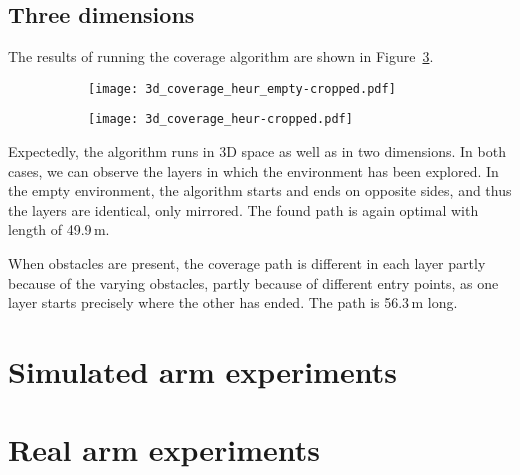 \documentclass[buriama8_dp.tex]{subfiles}
\begin{document}
\subsection{Three dimensions}
\label{subsec:3d_sim}

The results of running the coverage algorithm are shown in Figure~\ref{fig:heur_3d_coverage}.

\begin{figure}[ht]
  \centering
  \begin{subfigure}[t]{0.48\textwidth}
    \texttt{[image: 3d\_coverage\_heur\_empty-cropped.pdf]}
    \caption{}
    \label{fig:heur_3d_empty}
  \end{subfigure}
  \;
  \begin{subfigure}[t]{0.48\textwidth}
    \texttt{[image: 3d\_coverage\_heur-cropped.pdf]}
    \caption{}
    \label{fig:heur_3d_env}
  \end{subfigure}
  
  \caption[Coverage path -- compact space heuristic in 3D]{}
  \label{fig:heur_3d_coverage}
\end{figure}

Expectedly, the algorithm runs in 3D space as well as in two dimensions. In both cases, we can observe the layers in which the environment has been explored. In the empty environment, the algorithm starts and ends on opposite sides, and thus the layers are identical, only mirrored. The found path is again optimal with length of 49.9\,m.

When obstacles are present, the coverage path is different in each layer partly because of the varying obstacles, partly because of different entry points, as one layer starts precisely where the other has ended. The path is 56.3\,m long.


\section{Simulated arm experiments}
\label{sec:exp_sim_arm}

\section{Real arm experiments}
\label{sec:exp_real_arm}
\end{document}
